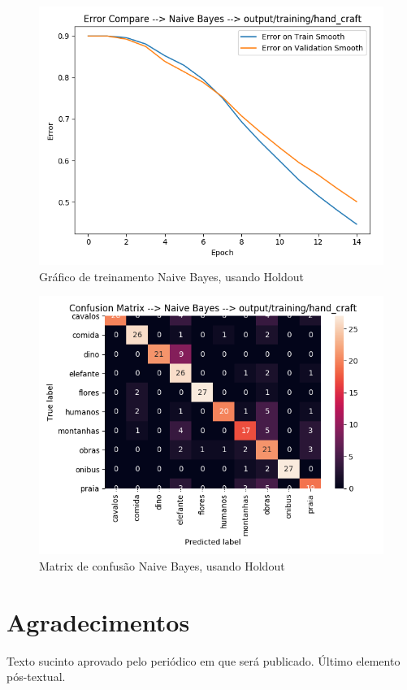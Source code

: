 \documentclass[
article,			%
11pt,				%
oneside,			%
a4paper,			%
english,			%
brazil,				%
sumario=tradicional,
]{abntex2}
\begin{document}
\begin{anexosenv}
			\begin{figure}[htb]
			\caption{\label{error-naive-bayes-hand-craft-holdout}Gráfico de treinamento Naive Bayes, usando Holdout}
			\begin{center}
				\includegraphics[scale=0.5]{error-naive-bayes-hand-craft-holdout.png}
			\end{center}
		\end{figure}
	
			\begin{figure}[htb]
		\caption{\label{confusion-matrix-naive-holdout-hand-craft}Matrix de confusão Naive Bayes, usando Holdout}
		\begin{center}
			\includegraphics[scale=0.5]{confusion-matrix-naive-holdout-hand-craft.png}
		\end{center}
	\end{figure}
	
	\end{anexosenv}
	
	
	\section*{Agradecimentos}
	Texto sucinto aprovado pelo periódico em que será publicado. Último 
	elemento pós-textual.
	
\end{document}
